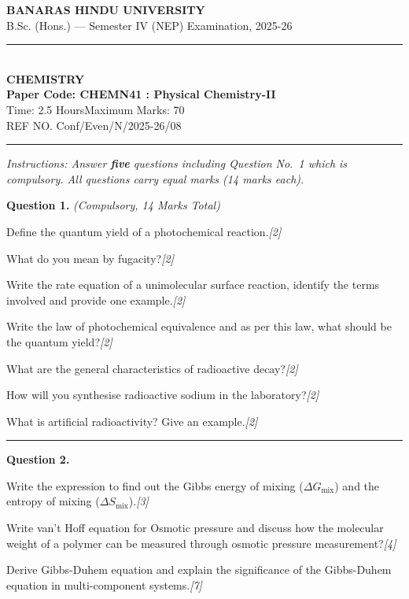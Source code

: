 \documentclass[11pt,a4paper]{article}
\newcommand{\pts}[1]{\hfill   \textit{[#1]}}
\begin{document}
\begin{center}
  {\large\bfseries BANARAS HINDU UNIVERSITY}\\[2pt]
  {\normalsize B.Sc. (Hons.) --- Semester IV (NEP) Examination, 2025-26}\\[6pt]
  \rule{0.8\linewidth}{0.5pt}\\[6pt]
  {\large\bfseries CHEMISTRY}\\[4pt]
  {\large\bfseries Paper Code: CHEMN41 : Physical Chemistry-II}\\[4pt]
  {\normalsize Time: 2.5 Hours\hfill Maximum Marks: 70}\\[2pt]
  {\small REF NO. Conf/Even/N/2025-26/08}
\end{center}

\rule{\linewidth}{0.4pt}

\smallskip



\noindent   \textit{Instructions: Answer   \textbf{five} questions including Question No.~1 which is compulsory. All questions carry equal marks (14 marks each).}

\bigskip




\noindent   \textbf{Question 1.}   \textit{(Compulsory, 14 Marks Total)}

\begin{parts}
  \item Define the quantum yield of a photochemical reaction.\pts{2}
  \item What do you mean by fugacity?\pts{2}
  \item Write the rate equation of a unimolecular surface reaction, identify the terms involved and provide one example.\pts{2}
  \item Write the law of photochemical equivalence and as per this law, what should be the quantum yield?\pts{2}
  \item What are the general characteristics of radioactive decay?\pts{2}
  \item How will you synthesise radioactive sodium in the laboratory?\pts{2}
  \item What is artificial radioactivity? Give an example.\pts{2}
\end{parts}

\medskip\rule{\linewidth}{0.2pt}\medskip




\noindent   \textbf{Question 2.}

\begin{parts}
  \item Write the expression to find out the Gibbs energy of mixing ($\Delta G_{ \text{mix}}$) and the entropy of mixing ($\Delta S_{ \text{mix}}$).\pts{3}
  \item Write van't Hoff equation for Osmotic pressure and discuss how the molecular weight of a polymer can be measured through osmotic pressure measurement?\pts{4}
  \item Derive Gibbs-Duhem equation and explain the significance of the Gibbs-Duhem equation in multi-component systems.\pts{7}
\end{parts}
\end{document}

